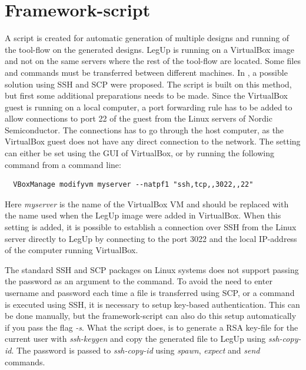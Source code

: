 \section{\label{sec:hlsscript}Framework-script}
A script is created for automatic generation of multiple designs and running of the tool-flow on the generated designs. LegUp is running on a VirtualBox image and not on the same servers where the rest of the tool-flow are located. Some files and commands must be transferred between different machines. In \cite{holm2015pro}, a possible solution using SSH and SCP were proposed. The script is built on this method, but first some additional preparations needs to be made. Since the VirtualBox guest is running on a local computer, a port forwarding rule has to be added to allow connections to port 22 of the guest from the Linux servers of Nordic Semiconductor. The connections has to go through the host computer, as the VirtualBox guest does not have any direct connection to the network. The setting can either be set using the GUI of VirtualBox, or by running the following command from a command line:
\begin{verbatim}
  VBoxManage modifyvm myserver --natpf1 "ssh,tcp,,3022,,22"  
\end{verbatim}
Here \textit{myserver} is the name of the VirtualBox VM and should be replaced with the name used when the LegUp image were added in VirtualBox. When this setting is added, it is possible to establish a connection over SSH from the Linux server directly to LegUp by connecting to the port 3022 and the local IP-address of the computer running VirtualBox.

The standard SSH and SCP packages on Linux systems does not support passing the password as an argument to the command. To avoid the need to enter username and password each time a file is transferred using SCP, or a command is executed using SSH, it is necessary to setup key-based authentication. This can be done manually, but the framework-script can also do this setup automatically if you pass the flag \textit{-s}. What the script does, is to generate a RSA key-file for the current user with \textit{ssh-keygen} and copy the generated file to LegUp using \textit{ssh-copy-id}. The password is passed to \textit{ssh-copy-id} using \textit{spawn}, \textit{expect} and \textit{send} commands.

